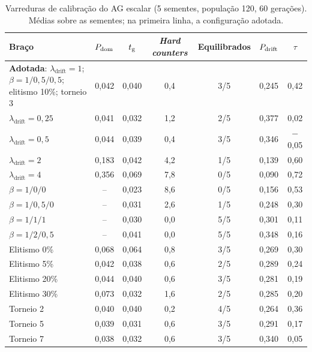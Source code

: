\begin{table}[htbp]
    \caption[Varreduras de calibração do AG escalar]{Varreduras de calibração do AG escalar (5 sementes, população 120, 60 gerações). Médias sobre as sementes; na primeira linha, a configuração adotada.}
    \label{tab: calibracao}
    \centering
    \footnotesize
    \begin{tabularx}{\textwidth}{X c c c c c c}
        \toprule
        \textbf{Braço} & $P_{\mathrm{dom}}$ & $t_{\mathrm{g}}$ & \textbf{\textit{Hard counters}} & \textbf{Equilibrados} & $P_{\mathrm{drift}}$ & $\tau$ \\
        \midrule
        \textbf{Adotada}: $\lambda_{\mathrm{drift}} = 1$; $\beta = 1/0{,}5/0{,}5$; elitismo 10\%; torneio 3 & 0,042 & 0,040 & 0,4 & 3/5 & 0,245 & 0,42 \\
        \midrule
        $\lambda_{\mathrm{drift}} = 0{,}25$ & 0,041 & 0,032 & 1,2 & 2/5 & 0,377 & 0,02 \\
        $\lambda_{\mathrm{drift}} = 0{,}5$  & 0,044 & 0,039 & 0,4 & 3/5 & 0,346 & $-$0,05 \\
        $\lambda_{\mathrm{drift}} = 2$      & 0,183 & 0,042 & 4,2 & 1/5 & 0,139 & 0,60 \\
        $\lambda_{\mathrm{drift}} = 4$      & 0,356 & 0,069 & 7,8 & 0/5 & 0,090 & 0,72 \\
        \midrule
        $\beta = 1/0/0$       & -- & 0,023 & 8,6 & 0/5 & 0,156 & 0,53 \\
        $\beta = 1/0{,}5/0$   & -- & 0,031 & 2,6 & 1/5 & 0,248 & 0,30 \\
        $\beta = 1/1/1$       & -- & 0,030 & 0,0 & 5/5 & 0,301 & 0,11 \\
        $\beta = 1/2/0{,}5$   & -- & 0,041 & 0,0 & 5/5 & 0,348 & 0,16 \\
        \midrule
        Elitismo 0\%   & 0,068 & 0,064 & 0,8 & 3/5 & 0,269 & 0,30 \\
        Elitismo 5\%   & 0,042 & 0,038 & 0,6 & 2/5 & 0,289 & 0,24 \\
        Elitismo 20\%  & 0,044 & 0,040 & 0,6 & 3/5 & 0,281 & 0,19 \\
        Elitismo 30\%  & 0,073 & 0,032 & 1,6 & 2/5 & 0,285 & 0,20 \\
        \midrule
        Torneio 2 & 0,040 & 0,040 & 0,2 & 4/5 & 0,264 & 0,36 \\
        Torneio 5 & 0,039 & 0,031 & 0,6 & 3/5 & 0,291 & 0,17 \\
        Torneio 7 & 0,038 & 0,032 & 0,6 & 3/5 & 0,340 & 0,05 \\
        \bottomrule
    \end{tabularx}
    \source
\end{table}

